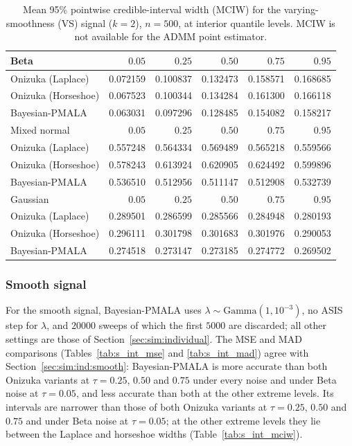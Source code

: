 \begin{table}[!htbp]
\centering
\small
\caption{Mean 95\% pointwise credible-interval width (MCIW) for the varying-smoothness (VS) signal ($k=2$), $n=500$, at interior quantile levels. MCIW is not available for the ADMM point estimator.}
\label{tab:vs_int_mciw}
\begin{tabular}{lrrrrr}
\toprule
Beta & $0.05$ & $0.25$ & $0.50$ & $0.75$ & $0.95$ \\
\midrule
Onizuka (Laplace) & 0.072159 & 0.100837 & 0.132473 & 0.158571 & 0.168685 \\
Onizuka (Horseshoe) & 0.067523 & 0.100344 & 0.134284 & 0.161300 & 0.166118 \\
Bayesian-PMALA & 0.063031 & 0.097296 & 0.128485 & 0.154082 & 0.158217 \\
\midrule
Mixed normal & $0.05$ & $0.25$ & $0.50$ & $0.75$ & $0.95$ \\
\midrule
Onizuka (Laplace) & 0.557248 & 0.564334 & 0.569489 & 0.565218 & 0.559566 \\
Onizuka (Horseshoe) & 0.578243 & 0.613924 & 0.620905 & 0.624492 & 0.599896 \\
Bayesian-PMALA & 0.536510 & 0.512956 & 0.511147 & 0.512908 & 0.532739 \\
\midrule
Gaussian & $0.05$ & $0.25$ & $0.50$ & $0.75$ & $0.95$ \\
\midrule
Onizuka (Laplace) & 0.289501 & 0.286599 & 0.285566 & 0.284948 & 0.280193 \\
Onizuka (Horseshoe) & 0.296111 & 0.301798 & 0.301683 & 0.301976 & 0.290053 \\
Bayesian-PMALA & 0.274518 & 0.273147 & 0.273185 & 0.274772 & 0.269502 \\
\bottomrule
\end{tabular}
\end{table}

\clearpage
\subsubsection{Smooth signal}
\label{app:sim:individual:smooth}
For the smooth signal, Bayesian-PMALA uses $\lambda\sim\mathrm{Gamma}(1,10^{-3})$, no ASIS step for $\lambda$, and $20000$ sweeps of which the first $5000$ are discarded; all other settings are those of Section~\ref{sec:sim:individual}. The MSE and MAD comparisons (Tables~\ref{tab:s_int_mse} and \ref{tab:s_int_mad}) agree with Section~\ref{sec:sim:ind:smooth}: Bayesian-PMALA is more accurate than both Onizuka variants at $\tau=0.25$, $0.50$ and $0.75$ under every noise and under Beta noise at $\tau=0.05$, and less accurate than both at the other extreme levels. Its intervals are narrower than those of both Onizuka variants at $\tau=0.25$, $0.50$ and $0.75$ and under Beta noise at $\tau=0.05$; at the other extreme levels they lie between the Laplace and horseshoe widths (Table~\ref{tab:s_int_mciw}).

